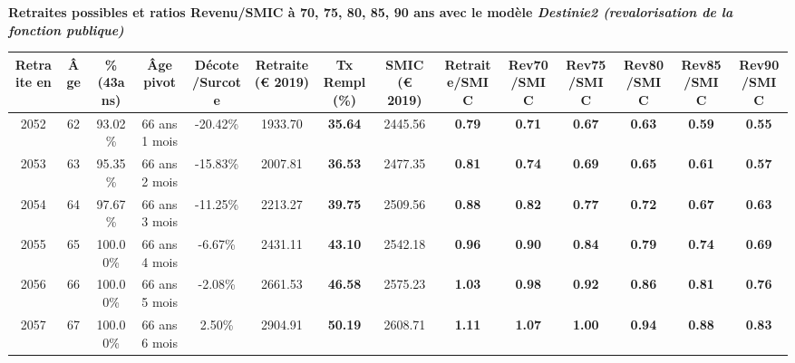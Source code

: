  \vspace{0.1cm} 
{\bf \noindent Retraites possibles et ratios Revenu/SMIC à 70, 75, 80, 85, 90 ans avec le modèle \emph{Destinie2 (revalorisation de la fonction publique)}}  
 
\begin{adjustbox}{max width=\textwidth} 
\begin{tabular}[htb]{|c|c||c|c|c||c|c||c||c|c|c|c|c|c|} 
\hline 
 Retraite en &  Âge &  \%(43ans) &  Âge pivot &  Décote/Surcote &  Retraite (\euro{} 2019) &  Tx Rempl(\%) &  SMIC (\euro{} 2019) &  Retraite/SMIC &  Rev70/SMIC &  Rev75/SMIC &  Rev80/SMIC &  Rev85/SMIC &  Rev90/SMIC \\ 
\hline \hline 
 2052 &  62 &  93.02\% &  66 ans 1 mois &  -20.42\% &  1933.70 &  {\bf 35.64} &  2445.56 &  {\bf {\color{red} 0.79}} &  {\bf {\color{red} 0.71}} &  {\bf {\color{red} 0.67}} &  {\bf {\color{red} 0.63}} &  {\bf {\color{red} 0.59}} &  {\bf {\color{red} 0.55}} \\ 
\hline 
 2053 &  63 &  95.35\% &  66 ans 2 mois &  -15.83\% &  2007.81 &  {\bf 36.53} &  2477.35 &  {\bf {\color{red} 0.81}} &  {\bf {\color{red} 0.74}} &  {\bf {\color{red} 0.69}} &  {\bf {\color{red} 0.65}} &  {\bf {\color{red} 0.61}} &  {\bf {\color{red} 0.57}} \\ 
\hline 
 2054 &  64 &  97.67\% &  66 ans 3 mois &  -11.25\% &  2213.27 &  {\bf 39.75} &  2509.56 &  {\bf {\color{red} 0.88}} &  {\bf {\color{red} 0.82}} &  {\bf {\color{red} 0.77}} &  {\bf {\color{red} 0.72}} &  {\bf {\color{red} 0.67}} &  {\bf {\color{red} 0.63}} \\ 
\hline 
 2055 &  65 &  100.00\% &  66 ans 4 mois &  -6.67\% &  2431.11 &  {\bf 43.10} &  2542.18 &  {\bf {\color{red} 0.96}} &  {\bf {\color{red} 0.90}} &  {\bf {\color{red} 0.84}} &  {\bf {\color{red} 0.79}} &  {\bf {\color{red} 0.74}} &  {\bf {\color{red} 0.69}} \\ 
\hline 
 2056 &  66 &  100.00\% &  66 ans 5 mois &  -2.08\% &  2661.53 &  {\bf 46.58} &  2575.23 &  {\bf 1.03} &  {\bf {\color{red} 0.98}} &  {\bf {\color{red} 0.92}} &  {\bf {\color{red} 0.86}} &  {\bf {\color{red} 0.81}} &  {\bf {\color{red} 0.76}} \\ 
\hline 
 2057 &  67 &  100.00\% &  66 ans 6 mois &  2.50\% &  2904.91 &  {\bf 50.19} &  2608.71 &  {\bf 1.11} &  {\bf 1.07} &  {\bf 1.00} &  {\bf {\color{red} 0.94}} &  {\bf {\color{red} 0.88}} &  {\bf {\color{red} 0.83}} \\ 
\hline 
\hline 
\end{tabular} 
\end{adjustbox} 
 
